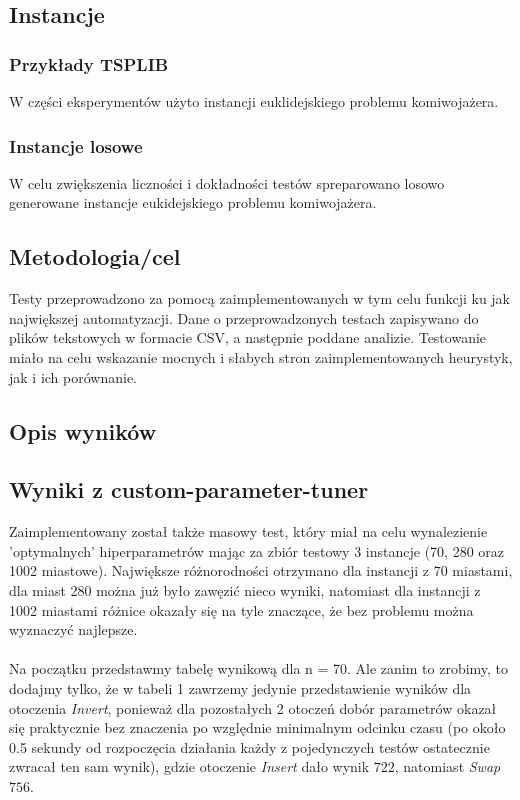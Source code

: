 \documentclass{article}
\begin{document}
\subsection{Instancje}
\subsubsection{Przykłady TSPLIB}
W części eksperymentów użyto instancji euklidejskiego problemu komiwojażera.

\subsubsection{Instancje losowe}
W celu zwiększenia liczności i dokładności testów spreparowano losowo generowane instancje eukidejskiego problemu komiwojażera.

\subsection{Metodologia/cel}

Testy przeprowadzono za pomocą zaimplementowanych w tym celu funkcji ku jak największej automatyzacji. Dane o przeprowadzonych testach zapisywano do plików tekstowych w formacie CSV, a następnie poddane analizie. Testowanie miało na celu wskazanie mocnych i słabych stron zaimplementowanych heurystyk, jak i ich porównanie.

\subsection{Opis wyników}

\subsection{Wyniki z custom-parameter-tuner}
Zaimplementowany został także masowy test, który miał na celu wynalezienie 'optymalnych' hiperparametrów mając za zbiór testowy 3 instancje (70, 280 oraz 1002 miastowe). Największe różnorodności otrzymano dla instancji z 70 miastami, dla miast 280 można już było zawęzić nieco wyniki, natomiast dla instancji z 1002 miastami różnice okazały się na tyle znaczące, że bez problemu można wyznaczyć najlepsze.
\\\\
Na początku przedstawmy tabelę wynikową dla n = 70. Ale zanim to zrobimy, to dodajmy tylko, że w tabeli 1 zawrzemy jedynie przedstawienie wyników dla otoczenia \textit{Invert}, ponieważ dla pozostałych 2 otoczeń dobór parametrów okazał się praktycznie bez znaczenia po względnie minimalnym odcinku czasu (po około 0.5 sekundy od rozpoczęcia działania każdy z pojedynczych testów ostatecznie zwracał ten sam wynik), gdzie otoczenie \textit{Insert} dało wynik $722$, natomiast \textit{Swap} $756$.
\end{document}
